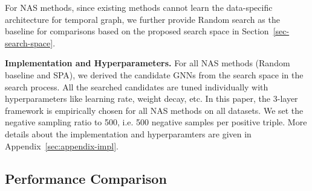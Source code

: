 \documentclass[11pt]{article}
\begin{document}
For NAS methods, 
since existing methods cannot learn the data-specific architecture for temporal graph, 
we further provide Random search as the baseline for comparisons based on the proposed search space in Section~\ref{sec-search-space}.

\noindent\textbf{Implementation and Hyperparameters.} For all NAS methods (Random baseline and SPA), 
we derived the candidate GNNs from the search space in the search process. 
All the searched candidates are tuned individually with hyperparameters like learning rate, weight decay, etc.
In this paper, 
the 3-layer framework is empirically chosen for all NAS methods on all datasets.
We set the negative sampling ratio to 500, i.e. 500 negative samples per positive triple.
More details about the implementation and hyperparamters are given in Appendix~\ref{sec:appendix-impl}.

\subsection{Performance Comparison}
\end{document}
